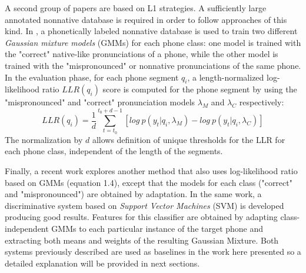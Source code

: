 A second group of papers are based on L1 strategies. A sufficiently large annotated nonnative
database is required in order to follow approaches of this kind.
In \cite{detection_phone_level_mispronunciation_learning}, a phonetically labeled nonnative
database is used to train two different \textit{Gaussian mixture models} (GMMs) for each phone
class: one model is trained with the "correct" native-like pronunciations of a phone, while the
other model is trained with the "mispronounced" or nonnative pronunciations of the same phone.
In the evaluation phase, for each phone segment $q_{i}$, a length-normalized log-likelihood ratio
$LLR(q_{i})$ score is computed for the phone segment by using the "mispronounced" and "correct"
pronunciation models $\lambda_{M}$ and $\lambda_{C}$ respectively:
\begin{equation}
LLR(q_{i}) = \frac{1}{d}\sum_{t=t_{0}}^{t_{0}+d-1} [log \ p(y_{t}|q_{i}, \lambda_{M}) - log \ p(y_{t}|q_{i}, \lambda_{C})]
\end{equation}
The normalization by $d$ allows definition of unique thresholds for the LLR for each phone class, 
independent of the length of the segments.

Finally, a recent work \cite{main} explores another method that also uses 
log-likelihood ratio based on  GMMs (equation 1.4), except that the models for each 
class ("correct" and  "mispronounced") are obtained by adaptation. In the same work, 
a discriminative system based
on \textit{Support Vector Machines} (SVM) is developed producing good results. Features 
for this classifier are obtained by adapting class-independent GMMs to each particular 
instance of the target phone and extracting both means and weights of the resulting 
Gaussian Mixture.
Both systems
previously described are used as baselines in the work here presented so a detailed explanation
will be provided in next sections.

